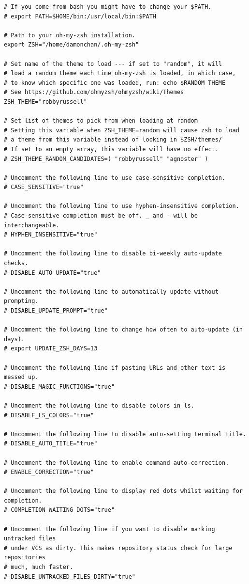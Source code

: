\documentclass[10pt]{article}
\begin{document}
\begin{verbatim}
# If you come from bash you might have to change your $PATH.
# export PATH=$HOME/bin:/usr/local/bin:$PATH

# Path to your oh-my-zsh installation.
export ZSH="/home/damonchan/.oh-my-zsh"

# Set name of the theme to load --- if set to "random", it will
# load a random theme each time oh-my-zsh is loaded, in which case,
# to know which specific one was loaded, run: echo $RANDOM_THEME
# See https://github.com/ohmyzsh/ohmyzsh/wiki/Themes
ZSH_THEME="robbyrussell"

# Set list of themes to pick from when loading at random
# Setting this variable when ZSH_THEME=random will cause zsh to load
# a theme from this variable instead of looking in $ZSH/themes/
# If set to an empty array, this variable will have no effect.
# ZSH_THEME_RANDOM_CANDIDATES=( "robbyrussell" "agnoster" )

# Uncomment the following line to use case-sensitive completion.
# CASE_SENSITIVE="true"

# Uncomment the following line to use hyphen-insensitive completion.
# Case-sensitive completion must be off. _ and - will be interchangeable.
# HYPHEN_INSENSITIVE="true"

# Uncomment the following line to disable bi-weekly auto-update checks.
# DISABLE_AUTO_UPDATE="true"

# Uncomment the following line to automatically update without prompting.
# DISABLE_UPDATE_PROMPT="true"

# Uncomment the following line to change how often to auto-update (in days).
# export UPDATE_ZSH_DAYS=13

# Uncomment the following line if pasting URLs and other text is messed up.
# DISABLE_MAGIC_FUNCTIONS="true"

# Uncomment the following line to disable colors in ls.
# DISABLE_LS_COLORS="true"

# Uncomment the following line to disable auto-setting terminal title.
# DISABLE_AUTO_TITLE="true"

# Uncomment the following line to enable command auto-correction.
# ENABLE_CORRECTION="true"

# Uncomment the following line to display red dots whilst waiting for completion.
# COMPLETION_WAITING_DOTS="true"

# Uncomment the following line if you want to disable marking untracked files
# under VCS as dirty. This makes repository status check for large repositories
# much, much faster.
# DISABLE_UNTRACKED_FILES_DIRTY="true"


\end{verbatim}
\end{document}
